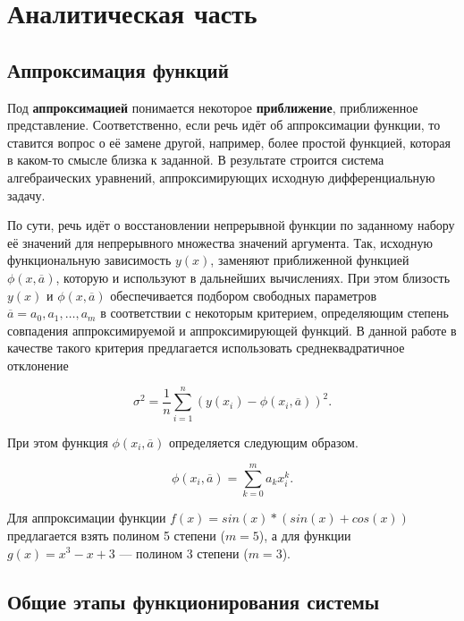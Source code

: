 \chapter{Аналитическая часть}

\section{Аппроксимация функций}

Под \textbf{аппроксимацией} понимается некоторое \textbf{приближение}, приближенное
представление. Соответственно, если речь идёт об аппроксимации функции, то ставится
вопрос о её замене другой, например, более простой функцией, которая в каком-то смысле
близка к заданной. В результате строится система
алгебраических уравнений, аппроксимирующих исходную дифференциальную задачу.

По сути, речь идёт о восстановлении непрерывной функции по заданному набору её значений для непрерывного множества значений аргумента. Так, исходную функциональную зависимость $y(x)$, заменяют приближенной функцией $\phi(x, \overline{a})$, которую и
используют в дальнейших вычислениях. При этом близость $y(x)$ и $\phi(x, \overline{a})$ обеспечивается подбором свободных параметров $\overline{a}={a_0, a_1, \dots, a_m}$ в соответствии с
некоторым критерием, определяющим степень совпадения аппроксимируемой и
аппроксимирующей функций. В данной работе в качестве такого критерия предлагается использовать среднеквадратичное отклонение

\label{deviation}
\begin{equation}
	\sigma^2 = \frac{1}{n}\sum_{i=1}^{n} (y(x_i) - \phi(x_i, \overline{a}))^2.
\end{equation}

При этом функция $\phi(x_i, \overline{a})$ определяется следующим образом.

\label{phi}
\begin{equation}
	\phi(x_i, \overline{a}) = \sum_{k=0}^{m} a_k x_i^k.
\end{equation}

Для аппроксимации функции $f(x) = sin(x)*(sin(x)+cos(x))$ предлагается взять полином 5 степени ($m = 5$), а для функции $g(x) = x^3 - x +3$ --- полином 3 степени ($m = 3$).

\section{Общие этапы функционирования системы}

